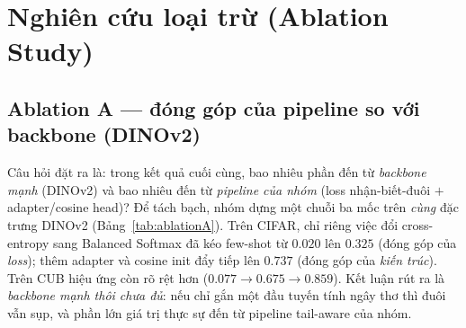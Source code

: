 

\section{Nghiên cứu loại trừ (Ablation Study)}

\subsection{Ablation A --- đóng góp của pipeline so với backbone (DINOv2)}

Câu hỏi đặt ra là: trong kết quả cuối cùng, bao nhiêu phần đến từ \emph{backbone mạnh} (DINOv2) và
bao nhiêu đến từ \emph{pipeline của nhóm} (loss nhận-biết-đuôi $+$ adapter/cosine head)? Để tách
bạch, nhóm dựng một chuỗi ba mốc trên \emph{cùng} đặc trưng DINOv2
(Bảng~\ref{tab:ablationA}). Trên CIFAR, chỉ riêng việc đổi cross-entropy sang Balanced Softmax đã
kéo few-shot từ $0.020$ lên $0.325$ (đóng góp của \emph{loss}); thêm adapter và cosine init đẩy tiếp
lên $0.737$ (đóng góp của \emph{kiến trúc}). Trên CUB hiệu ứng còn rõ rệt hơn
($0.077\to0.675\to0.859$). Kết luận rút ra là \emph{backbone mạnh thôi chưa đủ}: nếu chỉ gắn một đầu
tuyến tính ngây thơ thì đuôi vẫn sụp, và phần lớn giá trị thực sự đến từ pipeline tail-aware của
nhóm.

